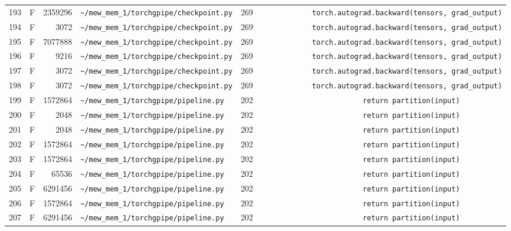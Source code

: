 \documentclass{article}
\begin{document}
\begin{longtable}{r l r p{6.5cm} r p{7.0cm}}
193 & F & 2359296 & \lstinline|~/mew_mem_1/torchgpipe/checkpoint.py| & 269 & \lstinline|            torch.autograd.backward(tensors, grad_output)| \\
194 & F & 3072 & \lstinline|~/mew_mem_1/torchgpipe/checkpoint.py| & 269 & \lstinline|            torch.autograd.backward(tensors, grad_output)| \\
195 & F & 7077888 & \lstinline|~/mew_mem_1/torchgpipe/checkpoint.py| & 269 & \lstinline|            torch.autograd.backward(tensors, grad_output)| \\
196 & F & 9216 & \lstinline|~/mew_mem_1/torchgpipe/checkpoint.py| & 269 & \lstinline|            torch.autograd.backward(tensors, grad_output)| \\
197 & F & 3072 & \lstinline|~/mew_mem_1/torchgpipe/checkpoint.py| & 269 & \lstinline|            torch.autograd.backward(tensors, grad_output)| \\
198 & F & 3072 & \lstinline|~/mew_mem_1/torchgpipe/checkpoint.py| & 269 & \lstinline|            torch.autograd.backward(tensors, grad_output)| \\
199 & F & 1572864 & \lstinline|~/mew_mem_1/torchgpipe/pipeline.py| & 202 & \lstinline|                        return partition(input)| \\
200 & F & 2048 & \lstinline|~/mew_mem_1/torchgpipe/pipeline.py| & 202 & \lstinline|                        return partition(input)| \\
201 & F & 2048 & \lstinline|~/mew_mem_1/torchgpipe/pipeline.py| & 202 & \lstinline|                        return partition(input)| \\
202 & F & 1572864 & \lstinline|~/mew_mem_1/torchgpipe/pipeline.py| & 202 & \lstinline|                        return partition(input)| \\
203 & F & 1572864 & \lstinline|~/mew_mem_1/torchgpipe/pipeline.py| & 202 & \lstinline|                        return partition(input)| \\
204 & F & 65536 & \lstinline|~/mew_mem_1/torchgpipe/pipeline.py| & 202 & \lstinline|                        return partition(input)| \\
205 & F & 6291456 & \lstinline|~/mew_mem_1/torchgpipe/pipeline.py| & 202 & \lstinline|                        return partition(input)| \\
206 & F & 1572864 & \lstinline|~/mew_mem_1/torchgpipe/pipeline.py| & 202 & \lstinline|                        return partition(input)| \\
207 & F & 6291456 & \lstinline|~/mew_mem_1/torchgpipe/pipeline.py| & 202 & \lstinline|                        return partition(input)| \\

\end{longtable}
\end{document}
